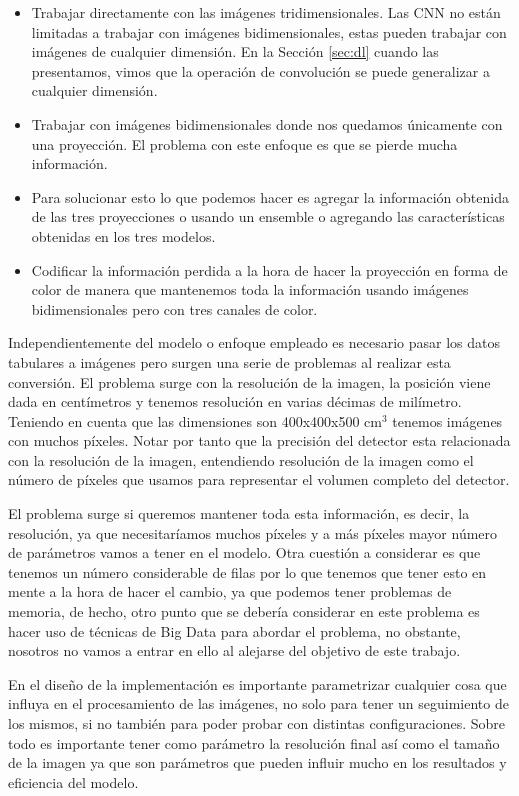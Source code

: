 \documentclass[a4paper,12pt,twoside,titlepage]{article}
\begin{document}
\begin{itemize}
  \item Trabajar directamente con las imágenes tridimensionales. Las CNN no están limitadas a trabajar con imágenes bidimensionales, estas pueden trabajar con imágenes de cualquier dimensión. En la Sección \ref{sec:dl} cuando las presentamos, vimos que la operación de convolución se puede generalizar a cualquier dimensión.
  \item Trabajar con imágenes bidimensionales donde nos quedamos únicamente con una proyección. El problema con este enfoque es que se pierde mucha información.
  \item Para solucionar esto lo que podemos hacer es agregar la información obtenida de las tres proyecciones o usando un ensemble o agregando las características obtenidas en los tres modelos.
  \item Codificar la información perdida a la hora de hacer la proyección en forma de color de manera que mantenemos toda la información usando imágenes bidimensionales pero con tres canales de color.
\end{itemize}

Independientemente del modelo o enfoque empleado es necesario pasar los datos tabulares a imágenes pero surgen una serie de problemas al realizar esta conversión. El problema surge con la resolución de la imagen, la posición viene dada en centímetros y tenemos resolución en varias décimas de milímetro. Teniendo en cuenta que las dimensiones son 400x400x500 cm$^3$ tenemos imágenes con muchos píxeles. Notar por tanto que la precisión del detector esta relacionada con la resolución de la imagen, entendiendo resolución de la imagen como el número de píxeles que usamos para representar el volumen completo del detector.

El problema surge si queremos mantener toda esta información, es decir, la resolución, ya que necesitaríamos muchos píxeles y a más píxeles mayor número de parámetros vamos a tener en el modelo. Otra cuestión a considerar es que tenemos un número considerable de filas por lo que tenemos que tener esto en mente a la hora de hacer el cambio, ya que podemos tener problemas de memoria, de hecho, otro punto que se debería considerar en este problema es hacer uso de técnicas de Big Data para abordar el problema, no obstante, nosotros no vamos a entrar en ello al alejarse del objetivo de este trabajo.

En el diseño de la implementación es importante parametrizar cualquier cosa que influya en el procesamiento de las imágenes, no solo para tener un seguimiento de los mismos, si no también para poder probar con distintas configuraciones. Sobre todo es importante tener como parámetro la resolución final así como el tamaño de la imagen ya que son parámetros que pueden influir mucho en los resultados y eficiencia del modelo.
\end{document}
